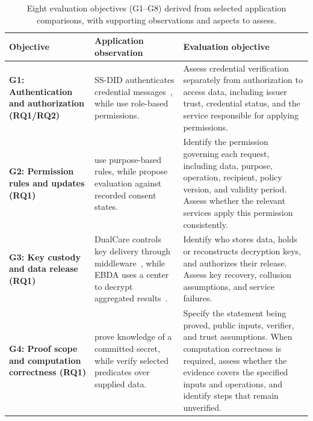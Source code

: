 \begin{table}[htbp]
\centering
\footnotesize
\setlength{\tabcolsep}{3pt}
\renewcommand{\arraystretch}{1.15}
\caption{Eight evaluation objectives (G1--G8) derived from selected application comparisons, with supporting observations and aspects to assess.}
\label{tab:architecture-requirements}
\begin{tabular}{@{}>{\raggedright\arraybackslash}m{}>{\raggedright\arraybackslash}m{}>{\raggedright\arraybackslash}m{}@{}}
\toprule
\textbf{Objective} & \textbf{Application observation} & \textbf{Evaluation objective} \\
\midrule

\textbf{G1: Authentication and authorization (RQ1/RQ2)} &
SS-DID authenticates credential messages~\cite{updateLiu2024SSDID}, while \citet{updateSeidi2025HealthcareSSI} use role-based permissions. &
Assess credential verification separately from authorization to access data, including issuer trust, credential status, and the service responsible for applying permissions. \\

\addlinespace[5pt]

\textbf{G2: Permission rules and updates (RQ1)} &
\citet{updateCan2024AuditableConsent} use purpose-based rules, while \citet{updateDauden2025RTBConsent} propose evaluation against recorded consent states. &
Identify the permission governing each request, including data, purpose, operation, recipient, policy version, and validity period. Assess whether the relevant services apply this permission consistently. \\

\addlinespace[5pt]

\textbf{G3: Key custody and data release (RQ1)} &
DualCare controls key delivery through middleware~\cite{updateHemlata2026DualCare}, while EBDA uses a center to decrypt aggregated results~\cite{2021-edge-light-smart-grid}. &
Identify who stores data, holds or reconstructs decryption keys, and authorizes their release. Assess key recovery, collusion assumptions, and service failures. \\

\addlinespace[5pt]

\textbf{G4: Proof scope and computation correctness (RQ1)} &
\citet{updateScaramuzza2026ZKConsent} prove knowledge of a committed secret, while \citet{updateGupta2026ScalableConsent} verify selected predicates over supplied data. &
Specify the statement being proved, public inputs, verifier, and trust assumptions. When computation correctness is required, assess whether the evidence covers the specified inputs and operations, and identify steps that remain unverified. \\


\end{tabular}
\end{table}
